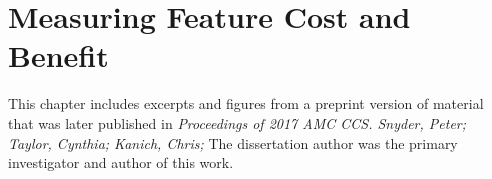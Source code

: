 \chapter{Measuring Feature Cost and Benefit}
\label{cost-benefit}

This chapter includes excerpts and figures from a preprint version of material
that was later published in \textit{Proceedings of 2017 AMC CCS. Snyder, Peter;
Taylor, Cynthia; Kanich, Chris;} The dissertation author was the primary
investigator and author of this work.






